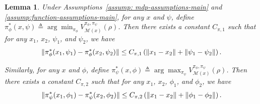 \documentclass{article}
\theoremstyle{plain}
\newtheorem{lemma}{Lemma}
\theoremstyle{definition}
\theoremstyle{remark}
\def\cM{\mathcal M}
\def\bydef{\triangleq}
\begin{document}
\begin{lemma}
    \label{lemma: lipschitz-constant-of-optimal-policy}
    Under Assumptions~\ref{assump: mdp-assumptions-main} and \ref{assump:function-assumptions-main}, for any $x$ and $\psi$,
    define $\pi_\phi^*(x,\psi) \bydef \arg\min_{\pi_\phi} V^{\pi_\phi,\pi_\psi}_{\cM(x)}(\rho)$. 
    Then there exists a constant $C_{\pi,1}$ such that for any $x_1$, $x_2$, $\psi_1$, and $\psi_2$, we have
    \begin{align}
        \| \pi_\phi^*(x_1,\psi_1) - \pi_\phi^*(x_2,\psi_2) \| \leq C_{\pi,1} \left( \|x_1 - x_2 \| + \| \psi_1 - \psi_2 \| \right). \notag
    \end{align}

    Similarly, for any $x$ and $\phi$, define $\pi_\psi^*(x,\phi) \bydef \arg\max_{\pi_\psi} V^{\pi_\phi,\pi_\psi}_{\cM(x)}(\rho)$. Then there exists a constant $C_{\pi,2}$ such that for any $x_1$, $x_2$, $\phi_1$, and $\phi_2$, we have
    \begin{align}
        \| \pi_\psi^*(x_1,\phi_1) - \pi_\psi^*(x_2,\phi_2) \| \leq C_{\pi,2} \left( \|x_1 - x_2 \| + \| \phi_1 - \phi_2 \| \right). \notag
    \end{align}  
\end{lemma}
\end{document}
